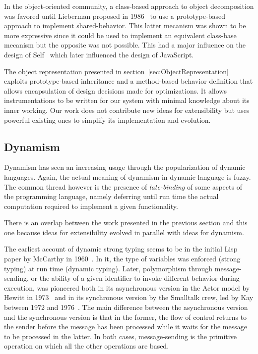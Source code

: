 In the object-oriented community, a class-based approach to object
decomposition was favored until Lieberman proposed in
1986~\cite{Lieberman:1986} to use a prototype-based approach to implement
shared-behavior. This latter mecanism was shown to be more expressive since it
could be used to implement an equivalent class-base mecanism but the opposite
was not possible. This had a major influence on the design of
Self~\cite{Ungar:1987} which later influenced the design of JavaScript.

The object representation presented in section~\ref{sec:ObjectRepresentation}
exploits prototype-based inheritance and a method-based behavior definition
that allows encapsulation of design decisions made for optimizations. It allows
instrumentations to be written for our system with minimal knowledge about its
inner working. Our work does not contribute new ideas for extensibility but
uses powerful existing ones to simplify its implementation and evolution.

\subsection{Dynamism}

Dynamism has seen an increasing usage through the popularization of dynamic
languages. Again, the actual meaning of dynamism in dynamic language is
fuzzy. The common thread however is the presence of \textit{late-binding} of
some aspects of the programming language, namely deferring until run time the
actual computation required to implement a given functionality.

There is an overlap between the work presented in the previous section and this
one because ideas for extensibility evolved in parallel with ideas for
dynamism.

The earliest account of dynamic strong typing seems to be in the initial Lisp
paper by McCarthy in 1960~\cite{McCarthy:1960}. In it, the type of variables
was enforced (strong typing) at run time (dynamic typing). Later, polymorphism
through message-sending, or the ability of a given identifier to invoke
different behavior during execution, was pioneered both in its asynchronous
version in the Actor model by Hewitt in 1973~\cite{Hewitt:1973} and in its
synchronous version by the Smalltalk crew, led by Kay between 1972 and
1976~\cite{Kay:1993}. The main difference between the asynchronous version and
the synchronous version is that in the former, the flow of control returns to
the sender before the message has been processed while it waits for the message
to be processed in the latter. In both cases, message-sending is the primitive
operation on which all the other operations are based.

